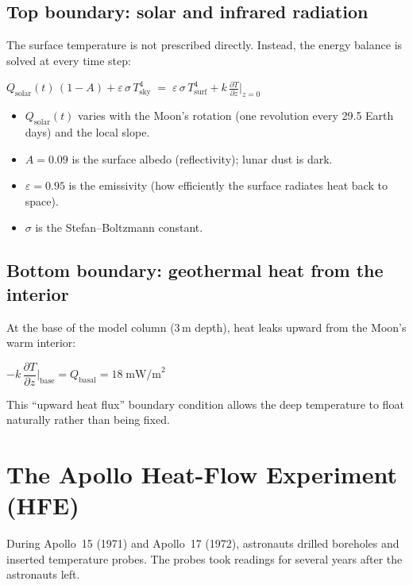 \documentclass[12pt, a4paper]{article}
\newcommand{\eqbox}[1]{%
  \begin{center}
    \colorbox{boxgray}{\parbox{0.88\linewidth}{\vspace{4pt}\centering#1\vspace{4pt}}}
  \end{center}
}
\begin{document}
\subsection{Top boundary: solar and infrared radiation}

The surface temperature is not prescribed directly.  Instead, the energy
balance is solved at every time step:

\eqbox{
  $Q_{\text{solar}}(t)\,(1-A) + \varepsilon\,\sigma\,T_{\text{sky}}^4
  \;=\; \varepsilon\,\sigma\,T_{\text{surf}}^4 + k\,\frac{\partial T}{\partial z}\bigg|_{z=0}$
}

\begin{itemize}
  \item $Q_{\text{solar}}(t)$ varies with the Moon's rotation (one revolution
        every 29.5 Earth days) and the local slope.
  \item $A = 0.09$ is the surface albedo (reflectivity); lunar dust is dark.
  \item $\varepsilon = 0.95$ is the emissivity (how efficiently the surface
        radiates heat back to space).
  \item $\sigma$ is the Stefan--Boltzmann constant.
\end{itemize}

\subsection{Bottom boundary: geothermal heat from the interior}

At the base of the model column (3\,m depth), heat leaks upward from the
Moon's warm interior:

\eqbox{
  $-k\,\dfrac{\partial T}{\partial z}\bigg|_{\text{base}} = Q_{\text{basal}} = 18\;\text{mW/m}^2$
}

This ``upward heat flux'' boundary condition allows the deep temperature to
float naturally rather than being fixed.

\section{The Apollo Heat-Flow Experiment (HFE)}

During Apollo~15 (1971) and Apollo~17 (1972), astronauts drilled boreholes
and inserted temperature probes.  The probes took readings for several years
after the astronauts left.
\end{document}
